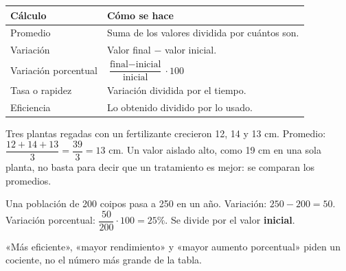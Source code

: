  
\begin{center}\small
\begin{tabularx}{\linewidth}{@{}>{\raggedright\arraybackslash\hsize=0.67\hsize}X>{\raggedright\arraybackslash\hsize=1.33\hsize}X@{}}
\toprule
\textbf{Cálculo} & \textbf{Cómo se hace} \\
\midrule
Promedio & Suma de los valores dividida por cuántos son. \\
Variación & Valor final \ensuremath{-} valor inicial. \\
Variación porcentual & $\dfrac{\text{final} - \text{inicial}}{\text{inicial}}\cdot 100$ \\
Tasa o rapidez & Variación dividida por el tiempo. \\
Eficiencia & Lo obtenido dividido por lo usado. \\
\bottomrule
\end{tabularx}
\end{center}
  
\begin{ejemplo} Tres plantas regadas con un fertilizante crecieron 12, 14 y 13 cm. Promedio: $\dfrac{12 + 14 + 13}{3} = \dfrac{39}{3} = 13$ cm. Un valor aislado alto, como 19 cm en una sola planta, no basta para decir que un tratamiento es mejor: se comparan los promedios.\end{ejemplo}
 
\begin{ejemplo} Una población de 200 coipos pasa a 250 en un año. Variación: $250 - 200 = 50$. Variación porcentual: $\dfrac{50}{200}\cdot 100 = 25\%$. Se divide por el valor \textbf{inicial}.\end{ejemplo}
 
\begin{clave}[{Recuerda}] «Más eficiente», «mayor rendimiento» y «mayor aumento porcentual» piden un cociente, no el número más grande de la tabla.\end{clave}
